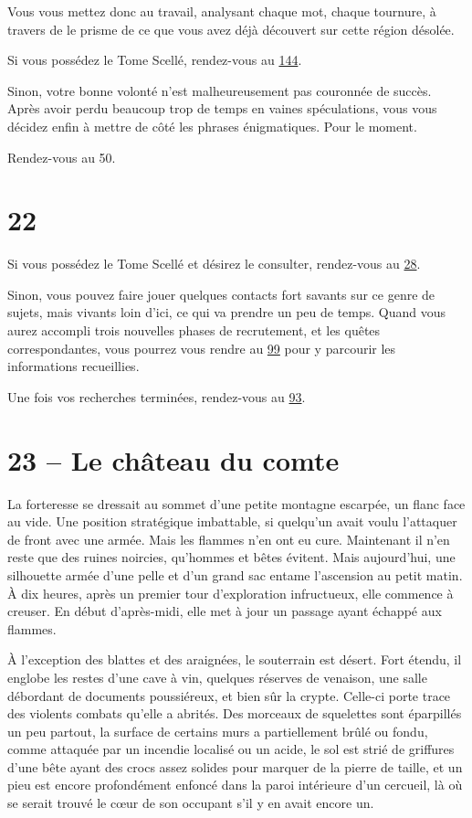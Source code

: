 \documentclass{report}
\newcommand{\gsection}[1]{
    \section{#1}
    \label{section-#1}
}
\newcommand{\glink}[1]{\hyperref[section-#1]{#1}}
\begin{document}
Vous vous mettez donc au travail, analysant chaque mot, chaque tournure, à travers de le prisme de ce que vous avez déjà découvert sur cette région désolée.

Si vous possédez le Tome Scellé, rendez-vous au \glink{144}.

Sinon, votre bonne volonté n'est malheureusement pas couronnée de succès. Après avoir perdu beaucoup trop de temps en vaines spéculations, vous vous décidez enfin à mettre de côté les phrases énigmatiques. Pour le moment.

Rendez-vous au 50.

\gsection{22}

Si vous possédez le Tome Scellé et désirez le consulter, rendez-vous au \glink{28}.

Sinon, vous pouvez faire jouer quelques contacts fort savants sur ce genre de sujets, mais vivants loin d'ici, ce qui va prendre un peu de temps. Quand vous aurez accompli trois nouvelles phases de recrutement, et les quêtes correspondantes, vous pourrez vous rendre au \glink{99} pour y parcourir les informations recueillies.

Une fois vos recherches terminées, rendez-vous au \glink{93}.

\gsection{23 – Le château du comte}

La forteresse se dressait au sommet d'une petite montagne escarpée, un flanc face au vide. Une position stratégique imbattable, si quelqu'un avait voulu l'attaquer de front avec une armée. Mais les flammes n'en ont eu cure. Maintenant il n'en reste que des ruines noircies, qu'hommes et bêtes évitent. Mais aujourd'hui, une silhouette armée d'une pelle et d'un grand sac entame l'ascension au petit matin. À dix heures, après un premier tour d'exploration infructueux, elle commence à creuser. En début d'après-midi, elle met à jour un passage ayant échappé aux flammes.

À l'exception des blattes et des araignées, le souterrain est désert. Fort étendu, il englobe les restes d'une cave à vin, quelques réserves de venaison, une salle débordant de documents poussiéreux, et bien sûr la crypte. Celle-ci porte trace des violents combats qu'elle a abrités. Des morceaux de squelettes sont éparpillés un peu partout, la surface de certains murs a partiellement brûlé ou fondu, comme attaquée par un incendie localisé ou un acide, le sol est strié de griffures d'une bête ayant des crocs assez solides pour marquer de la pierre de taille, et un pieu est encore profondément enfoncé dans la paroi intérieure d'un cercueil, là où se serait trouvé le cœur de son occupant s'il y en avait encore un.
\end{document}
